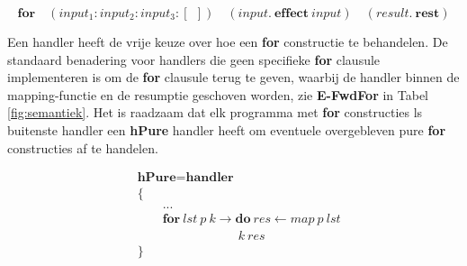 \begin{equation}
    \textbf{for}\quad (input_1:input_2:input_3:[\:\:]) \quad (input.\:\textbf{effect}\:input) \quad(result.\:\textbf{rest})
\end{equation}

Een handler heeft de vrije keuze over hoe een \textbf{for} constructie te behandelen. De standaard benadering voor handlers die geen specifieke \textbf{for} clausule implementeren is om de \textbf{for} clausule terug te geven, waarbij de handler binnen de mapping-functie en de resumptie geschoven worden, zie \textbf{E-FwdFor} in Tabel \ref{fig:semantiek}. Het is raadzaam dat elk programma met \textbf{for} constructies ls buitenste handler een \textbf{hPure} handler heeft om eventuele overgebleven pure \textbf{for} constructies af te handelen.

\begin{equation}
    \begin{split}
    & \textbf{hPure} = \textbf{handler} \\
    & \{ \\
    & \qquad ... \\
    & \qquad    \textbf{for}\:lst\:p\:k \rightarrow \textbf{do}\:res \leftarrow map\:p\:lst \\
    &  \qquad \qquad \qquad \qquad k\:res \\
    & \} 
\end{split}  
\end{equation}




